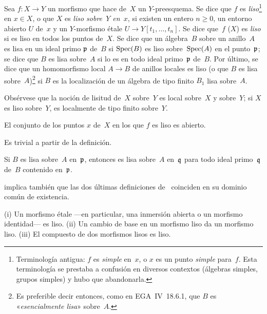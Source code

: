 \begin{definition}
\label{II.1.1}
Sea $f\colon X\to Y$ un morfismo que hace de~$X$ un $Y$-preesquema. Se dice que $f$ es \emph{liso}\footnote{Terminología antigua: $f$ es \emph{simple}
%
en~$x$, o $x$ es un punto \emph{simple} para~$f$. Esta terminología se prestaba a confusión en diversos contextos (álgebras simples, grupos simples) y hubo que abandonarla.}
%
en $x\in X$, o que $X$ es \emph{liso sobre~$Y$ en~$x$}, si existen un entero $n\geq0$, un entorno abierto $U$ de~$x$ y un $Y$-morfismo étale $U\to Y[t_1,\dots,t_n]$. Se dice que~$f$ (\resp $X$) es \emph{liso} si es liso en todos los puntos de~$X$. Se dice que un álgebra~$B$ sobre un anillo~$A$ es lisa en un ideal primo $\mathfrak{p}$ de~$B$ si $\operatorname{Spec}(B)$ es liso sobre~$\operatorname{Spec}(A)$ en el punto~$\mathfrak{p}$;
se dice que $B$ es lisa sobre~$A$ si lo es en todo ideal primo~$\mathfrak{p}$ de~$B$. Por último, se dice que un homomorfismo local $A\to B$ de anillos locales es liso (o que $B$ es lisa sobre~$A$)\footnote{Es preferible decir entonces, como en EGA~IV~18.6.1, que $B$ es «\emph{esencialmente lisa}» sobre~$A$.}
%
si $B$ es la localización de un álgebra de tipo finito $B_1$ lisa sobre~$A$.
\end{definition}

Obsérvese que la noción de lisitud de~$X$ sobre~$Y$ es local sobre~$X$ y sobre~$Y$; si $X$ es liso sobre~$Y$, es localmente de tipo finito sobre~$Y$.

\setcounter{subsection}{0}
\setcounter{proposition}{0}
\begin{proposition}
\label{prop:II.1.1}
El conjunto de los puntos $x$ de~$X$ en los que $f$ es liso es abierto.
\end{proposition}

Es trivial a partir de la definición.

\begin{corollaire}
\label{II.1.2}
Si $B$ es lisa sobre~$A$ en~$\mathfrak{p}$, entonces es lisa sobre~$A$ en~$\mathfrak{q}$ para todo ideal primo~$\mathfrak{q}$ de~$B$ contenido en~$\mathfrak{p}$.
\end{corollaire}

 implica también que las dos últimas definiciones de~ coinciden en su dominio común de existencia.

\begin{proposition}
\label{II.1.3}
\textup{(i)} Un morfismo étale ---en particular, una inmersión abierta o un morfismo identidad--- es liso. \textup{(ii)} Un cambio de base en un morfismo liso da un morfismo liso. \textup{(iii)} El compuesto de dos morfismos lisos es liso.
\end{proposition}

